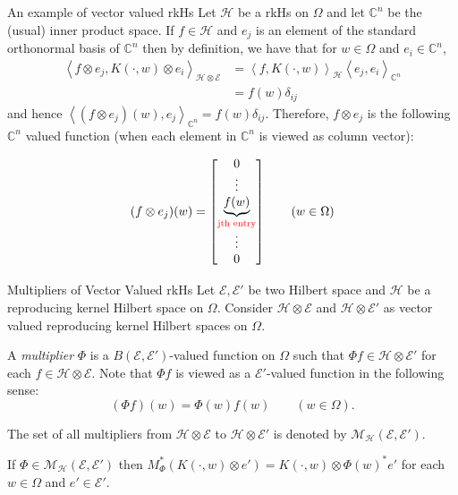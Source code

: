 \documentclass{beamer}
\newcommand{\C}{\mathbb C}
\newcommand{\calE}{{\mathcal E}}
\newcommand{\calH}{{\mathcal H}}
\newcommand{\calM}{{\mathcal M}}
\newcommand{\ip}[1]{\left\langle #1 \right\rangle}
\begin{document}
\begin{frame}{An example of vector valued rkHs}
Let $\calH$ be a rkHs on $\Omega$ and let $\C ^{n}$ be the (usual) inner product space.
\pause
If $f \in \calH$ and $e_{j}$ is an element of the standard orthonormal basis of $\C^{n}$ then by definition, we have that for $w \in \Omega$ and $e_{i} \in \C^{n}$,
\begin{align*}
\ip{f \otimes e_{j}, K\left( \cdot , w \right) \otimes e_{i}}_{\calH \otimes \calE} &= \ip{f, K\left( \cdot , w \right)}_{\calH} \ip{e_{j}, e_{i}}_{\C ^{n}} \\
&= f(w) \delta_{ij}
\end{align*}
and hence $\ip{(f\otimes e_{j})(w), e_{j}}_{\C ^{n}} = f(w)\delta_{ij}$. \pause Therefore, $f\otimes e_{j}$ is the following $\C^{n}$ valued function (when each element in $\C ^{n}$ is viewed as column vector):

\begin{equation*}
(f\otimes e_{j}) (w) = 
\begin{bmatrix}
0 \\
\vdots \\
\underbrace{f(w)}_{\textcolor{red}{\text{jth entry}}}\\
\vdots \\
0
\end{bmatrix} \qquad (w \in \Omega)
\end{equation*}
\end{frame}

\begin{frame}{Multipliers of Vector Valued rkHs}
Let $\calE, \calE'$ be two Hilbert space and $\calH$ be a reproducing kernel Hilbert space on $\Omega$. Consider $\calH \otimes \calE$ and $\calH \otimes \calE '$ as vector valued reproducing kernel Hilbert spaces on $\Omega$.

\pause

A \textit{multiplier} $\Phi$ is a $B\left( \calE , \calE' \right)$-valued function on $\Omega$ such that $\Phi f \in \calH \otimes \calE '$ for each $f \in \calH \otimes \calE$. Note that $\Phi f$ is viewed as a $\calE '$-valued function in the following sense:
\begin{equation*}
(\Phi f)(w) =  \Phi(w) f(w) \qquad (w \in \Omega).
\end{equation*}

The set of all multipliers from $\calH \otimes \calE$ to $\calH \otimes \calE'$ is denoted by $\calM _{\calH} \left( \calE , \calE' \right)$.

\pause

\begin{lemma}
If $\Phi \in \calM _{\calH} \left( \calE , \calE' \right)$ then $M_{\Phi}^{*} \left( K\left( \cdot , w \right) \otimes e' \right) = K\left( \cdot, w \right) \otimes \Phi(w) ^{*} e'$ for each $w\in \Omega$ and $e' \in \calE'$.
\end{lemma}
\end{frame}
\end{document}
